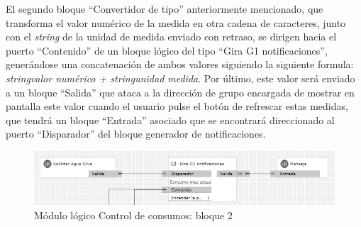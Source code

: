El segundo bloque “Convertidor de tipo” anteriormente mencionado, que transforma el valor numérico de la medida en otra cadena de caracteres,  junto con el \textit{string} de la unidad de medida enviado con retraso, se dirigen hacia el puerto “Contenido” de un bloque lógico del tipo “Gira G1 notificaciones”, generándose una concatenación de ambos valores siguiendo la siguiente formula: \textit{string{valor numérico} +  string{unidad medida}}. Por último, este valor será enviado a un bloque “Salida” que ataca a la dirección de grupo encargada de mostrar en pantalla este valor cuando el usuario pulse el botón de refrescar estas medidas, que tendrá un bloque “Entrada” asociado que se encontrará direccionado al puerto “Disparador” del bloque generador de notificaciones.
\begin{figure}[H]
\centering
\includegraphics[width=1.15\textwidth]{figures/log_consu_b2.png}   
\caption{Módulo lógico Control de consumos: bloque 2}
\label{fig:log_consu_b2}
\end{figure}


